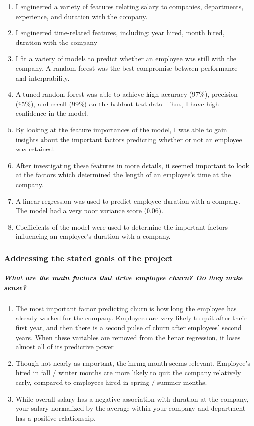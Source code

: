 \documentclass[11pt]{article}
\begin{document}
\begin{enumerate}
\def\labelenumi{(\arabic{enumi})}
\item
  I engineered a variety of features relating salary to companies,
  departments, experience, and duration with the company.
\item
  I engineered time-related features, including: year hired, month
  hired, duration with the company
\item
  I fit a variety of models to predict whether an employee was still
  with the company. A random forest was the best compromise between
  performance and interprability.
\item
  A tuned random forest was able to achieve high accuracy (97\%),
  precision (95\%), and recall (99\%) on the holdout test data. Thus, I
  have high confidence in the model.
\item
  By looking at the feature importances of the model, I was able to gain
  insights about the important factors predicting whether or not an
  employee was retained.
\item
  After investigating these features in more details, it seemed
  important to look at the factors which determined the length of an
  employee's time at the company.
\item
  A linear regression was used to predict employee duration with a
  company. The model had a very poor variance score (0.06).
\item
  Coefficients of the model were used to determine the important factors
  influencing an employee's duration with a company.
\end{enumerate}

\subsubsection{Addressing the stated goals of the
project}\label{addressing-the-stated-goals-of-the-project}

\subparagraph{What are the main factors that drive employee churn? Do
they make
sense?}\label{what-are-the-main-factors-that-drive-employee-churn-do-they-make-sense}

\begin{enumerate}
\def\labelenumi{(\arabic{enumi})}
\item
  The most important factor predicting churn is how long the employee
  has already worked for the company. Employees are very likely to quit
  after their first year, and then there is a second pulse of churn
  after employees' second years. When these variables are removed from
  the lienar regression, it loses almost all of its predictive power
\item
  Though not nearly as important, the hiring month seems relevant.
  Employee's hired in fall / winter months are more likely to quit the
  company relatively early, compared to employees hired in spring /
  summer months.
\item
  While overall salary has a negative association with duration at the
  company, your salary normalized by the average within your company and
  department has a positive relationship.
\end{enumerate}
\end{document}
